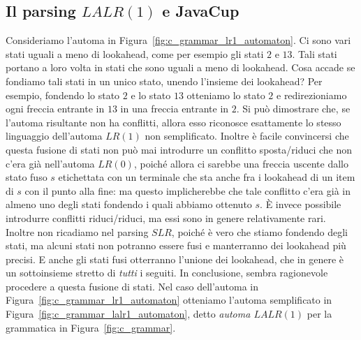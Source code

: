 \subsection{Il parsing $\mathit{LALR}(1)$ e JavaCup}\label{subsec:lalr1}
%
Consideriamo l'automa in Figura~\ref{fig:c_grammar_lr1_automaton}.
Ci sono vari stati uguali a meno di lookahead, come per esempio gli stati
$2$ e $13$. Tali stati portano a loro volta in stati che sono uguali a meno
di lookahead. Cosa accade se fondiamo tali stati in un unico stato,
unendo l'insieme dei lookahead? Per esempio, fondendo lo stato $2$ e lo
stato $13$ otteniamo lo stato $2$ e redirezioniamo ogni freccia entrante in
$13$ in una freccia entrante in $2$. Si pu\`o dimostrare che, se l'automa
risultante non ha conflitti, allora esso riconosce esattamente lo stesso
linguaggio dell'automa $\mathit{LR}(1)$ non semplificato. Inoltre \`e facile
convincersi che questa fusione di stati non pu\`o mai introdurre un
conflitto sposta/riduci che non c'era gi\`a nell'automa $\mathit{LR}(0)$,
poich\'e allora ci sarebbe una freccia uscente dallo stato fuso $s$ etichettata
con un terminale che sta anche fra i lookahead di un item di $s$ con il punto
alla fine: ma questo implicherebbe che tale conflitto c'era gi\`a in almeno
uno degli stati fondendo i quali abbiamo ottenuto $s$. \`E invece possibile
introdurre conflitti riduci/riduci, ma essi sono in genere relativamente rari.
Inoltre non ricadiamo nel parsing $\mathit{SLR}$, poich\'e \`e vero che
stiamo fondendo degli stati, ma alcuni stati non potranno essere fusi
e manterranno dei lookahead pi\`u precisi. E anche gli stati fusi
otterranno l'unione dei lookahead, che in genere \`e un sottoinsieme stretto
di \emph{tutti} i seguiti. In conclusione, sembra ragionevole procedere a
questa fusione di stati. Nel caso dell'automa in
Figura~\ref{fig:c_grammar_lr1_automaton} otteniamo l'automa semplificato
in Figura~\ref{fig:c_grammar_lalr1_automaton}, detto
\emph{automa $\mathit{LALR}(1)$} per la grammatica in
Figura~\ref{fig:c_grammar}.
%
